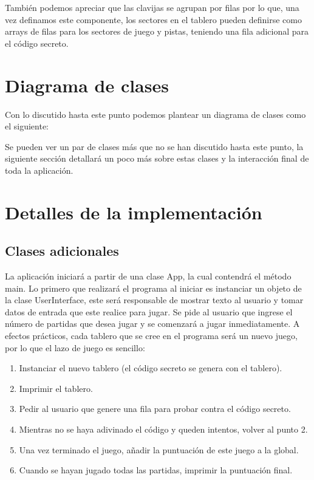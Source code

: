 \documentclass[a4paper,titlepage]{article}
\begin{document}
También podemos apreciar que las clavijas se agrupan por filas por lo que,
una vez definamos este componente, los sectores en el tablero pueden definirse
como arrays de filas para los sectores de juego y pistas, teniendo una fila
adicional para el código secreto.

\section{Diagrama de clases}

Con lo discutido hasta este punto podemos plantear un diagrama de clases como
el siguiente:

\begin{figure}[H]
    \centering
    \scalebox{.6}{
        
    }
\end{figure}

Se pueden ver un par de clases más que no se han discutido hasta este punto,
la siguiente sección detallará un poco más sobre estas clases y la interacción
final de toda la aplicación.

\section{Detalles de la implementación}

\subsection{Clases adicionales}

La aplicación iniciará a partir de una clase App, la cual contendrá el método
main. Lo primero que realizará el programa al iniciar es instanciar un objeto
de la clase UserInterface, este será responsable de mostrar texto al usuario y
tomar datos de entrada que este realice para jugar.
Se pide al usuario que ingrese el número de partidas que desea jugar y se
comenzará a jugar inmediatamente.
A efectos prácticos, cada tablero que se cree en el programa será un nuevo
juego, por lo que el lazo de juego es sencillo:

\begin{enumerate}
    \item Instanciar el nuevo tablero (el código secreto se genera con el tablero).
    \item Imprimir el tablero.
    \item Pedir al usuario que genere una fila para probar contra el código secreto.
    \item Mientras no se haya adivinado el código y queden intentos, volver al punto 2.
    \item Una vez terminado el juego, añadir la puntuación de este juego a la global.
    \item Cuando se hayan jugado todas las partidas, imprimir la puntuación final.
\end{enumerate}
\end{document}
